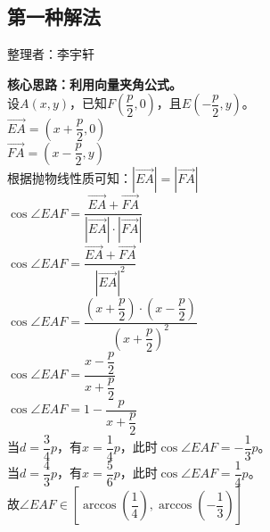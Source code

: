 \documentclass[UTF8]{ctexart}
\begin{document}
\subsection{第一种解法}
    \begin{center}
        整理者：李宇轩
    \end{center}
    \begin{multicols}{2}
        \small
        \textbf{核心思路：利用向量夹角公式。}\\[5mm]
        设$A(x,y)$，已知$F\left(\dfrac{p}{2},0\right)$，且$E\left(-\dfrac{p}{2},y\right)$。\\[5mm]
        $\overrightarrow{EA}=\left(x+\dfrac{p}{2},0\right)$\\[5mm]
        $\overrightarrow{FA}=\left(x-\dfrac{p}{2},y\right)$\\[5mm]
        根据抛物线性质可知：$|\overrightarrow{EA}|=|\overrightarrow{FA}|$\\[5mm]
        $\cos{\angle EAF}=\dfrac{\overrightarrow{EA}+\overrightarrow{FA}}{|\overrightarrow{EA}|\cdot|\overrightarrow{FA}|}$\\[5mm]
        $\cos{\angle EAF}=\dfrac{\overrightarrow{EA}+\overrightarrow{FA}}{|\overrightarrow{EA}|^2}$\\[7mm]
        $\cos{\angle EAF}=\dfrac{\left(x+\dfrac{p}{2}\right)\cdot\left(x-\dfrac{p}{2}\right)}{\left(x+\dfrac{p}{2}\right)^2}$\\[5mm]
        $\cos{\angle EAF}=\dfrac{x-\dfrac{p}{2}}{x+\dfrac{p}{2}}$\\[5mm]
        $\cos{\angle EAF}=1-\dfrac{p}{x+\dfrac{p}{2}}$\\[8mm]
        当$d=\dfrac{3}{4}p$，有$x=\dfrac{1}{4}p$，此时$\cos{\angle EAF}=-\dfrac{1}{3}p$。\\[5mm]
        当$d=\dfrac{4}{3}p$，有$x=\dfrac{5}{6}p$，此时$\cos{\angle EAF}=\dfrac{1}{4}p$。\\[5mm]
        故$\angle EAF\in\left[\arccos{\left(\dfrac{1}{4}\right)},\arccos{\left(-\dfrac{1}{3}\right)}\right]$
        \newpage
    \end{multicols}

\newpage
\end{document}
